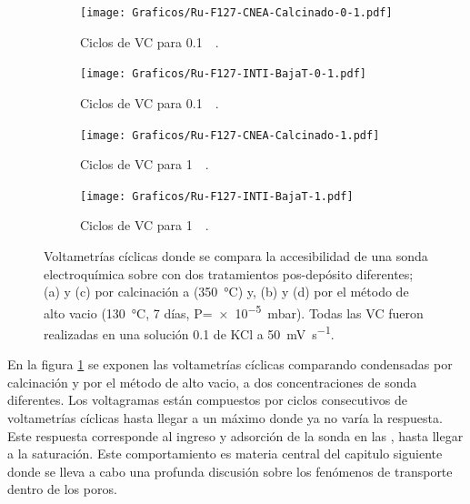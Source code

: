 	  		\begin{figure}[ht!]
		 	
		 	\begin{subfigure}[t]{0.5\textwidth}
		          	\texttt{[image: Graficos/Ru-F127-CNEA-Calcinado-0-1.pdf]}
		          	\vspace*{-6mm}
		         	\caption{Ciclos de VC para \ru\space \SI{0.1}{\milli\Molar}.}
		          	\vspace*{3mm}
		          	\end{subfigure}
		    \begin{subfigure}[t]{0.5\textwidth}
		          	\texttt{[image: Graficos/Ru-F127-INTI-BajaT-0-1.pdf]}
		         	\vspace*{-6mm}
		         	\caption{Ciclos de VC para \ru\space \SI{0.1}{\milli\Molar}.}
		      		\vspace*{3mm}
		      		\end{subfigure}
		    \begin{subfigure}[t]{0.5\textwidth}
		          	\texttt{[image: Graficos/Ru-F127-CNEA-Calcinado-1.pdf]}
		         	\vspace*{-6mm}
		         	\caption{Ciclos de VC para \ru\space \SI{1}{\milli\Molar}.}
		            \vspace*{3mm}
		            \end{subfigure}
		    \begin{subfigure}[t]{0.5\textwidth}
		          	\texttt{[image: Graficos/Ru-F127-INTI-BajaT-1.pdf]}
		         	\vspace*{-6mm}
		         	\caption{Ciclos de VC para \ru\space \SI{1}{\milli\Molar}.}
		    		\vspace*{3mm}
		    		\end{subfigure}
		      	 	\caption[Voltagrama comparativo SF calcinados/alto vacío I]{Voltametrías cíclicas donde se compara la accesibilidad de una sonda electroquímica sobre \pdmF\space con dos tratamientos pos-depósito diferentes; (a) y (c) por calcinación a (\SI{350}{\celsius}) y, (b) y (d) por el método de alto vacio (\SI{130}{\celsius}, 7 días, P=\SI{e-5}{\milli\bar}). Todas las VC fueron realizadas en una solución \SI{0.1}{\Molar} de KCl a \SI{50}{\milli\volt\per\second}.}
		      		\label{fig:comp-calc-vacio}
	      \end{figure}

	  En la figura \ref{fig:comp-calc-vacio} se exponen las voltametrías cíclicas comparando \pdmF\space condensadas por calcinación y por el método de alto vacio, a dos concentraciones de sonda diferentes. Los voltagramas están compuestos por ciclos consecutivos de voltametrías cíclicas hasta llegar a un máximo donde ya no varía la respuesta. Este respuesta corresponde al ingreso y adsorción de la sonda en las \pdm, hasta llegar a la saturación. Este comportamiento es materia central del capitulo siguiente donde se lleva a cabo una profunda discusión sobre los fenómenos de transporte dentro de los poros.

